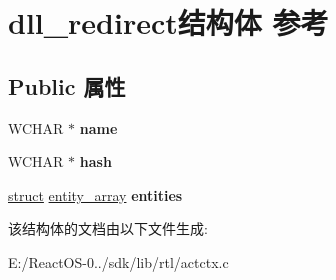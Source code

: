 \hypertarget{structdll__redirect}{}\section{dll\+\_\+redirect结构体 参考}
\label{structdll__redirect}
\subsection*{Public 属性}
\begin{DoxyCompactItemize}
\item 
\mbox{\label{structdll__redirect_a6fb2e5fe721764b77e2ea004772de6fa}} 
W\+C\+H\+AR $\ast$ {\bfseries name}
\item 
\mbox{\label{structdll__redirect_a73a5262c4d020bc6cc0c2c9913ff7b68}} 
W\+C\+H\+AR $\ast$ {\bfseries hash}
\item 
\mbox{\label{structdll__redirect_ae3f5184d9747ee078b2f630708d4e3d7}} 
\hyperlink{interfacestruct}{struct} \hyperlink{structentity__array}{entity\+\_\+array} {\bfseries entities}
\end{DoxyCompactItemize}


该结构体的文档由以下文件生成\+:\begin{DoxyCompactItemize}
\item 
E\+:/\+React\+O\+S-\/0../sdk/lib/rtl/actctx.\+c\end{DoxyCompactItemize}
